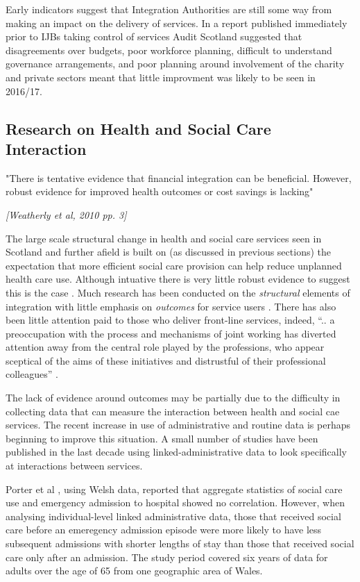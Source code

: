 \documentclass[12pt,]{report}
\begin{document}
Early indicators suggest that Integration Authorities are still some way
from making an impact on the delivery of services. In a report published
immediately prior to IJBs taking control of services Audit Scotland
\citeyearpar{RN252} suggested that disagreements over budgets, poor
workforce planning, difficult to understand governance arrangements, and
poor planning around involvement of the charity and private sectors
meant that little improvment was likely to be seen in 2016/17.

\subsection{Research on Health and Social Care Interaction}\label{subsec:research}

\epigraph{"There is tentative evidence that financial integration can be beneficial. However, robust evidence for improved health outcomes or cost savings is lacking"}{\textit{[Weatherly et al, 2010 pp. 3]}}

The large scale structural change in health and social care services
seen in Scotland and further afield is built on (as discussed in
previous sections) the expectation that more efficient social care
provision can help reduce unplanned health care use. Although intuative
there is very little robust evidence to suggest this is the case
\citep{RN366, RN467, RN369}. Much research has been conducted on the
\textit{structural} elements of integration with little emphasis on
\textit{outcomes} for service users \citep{RN141}. There has also been
little attention paid to those who deliver front-line services, indeed,
``.. a preoccupation with the process and mechanisms of joint working
has diverted attention away from the central role played by the
professions, who appear sceptical of the aims of these initiatives and
distrustful of their professional colleagues'' \citep[pp.12]{RN467}.

The lack of evidence around outcomes may be partially due to the
difficulty in collecting data that can measure the interaction between
health and social cae services. The recent increase in use of
administrative and routine data is perhaps beginning to improve this
situation. A small number of studies have been published in the last
decade using linked-administrative data to look specifically at
interactions between services.

Porter et al \citeyearpar{RN462}, using Welsh data, reported that
aggregate statistics of social care use and emergency admission to
hospital showed no correlation. However, when analysing individual-level
linked administrative data, those that received social care before an
emeregency admission episode were more likely to have less subsequent
admissions with shorter lengths of stay than those that received social
care only after an admission. The study period covered six years of data
for adults over the age of 65 from one geographic area of Wales.
\end{document}
